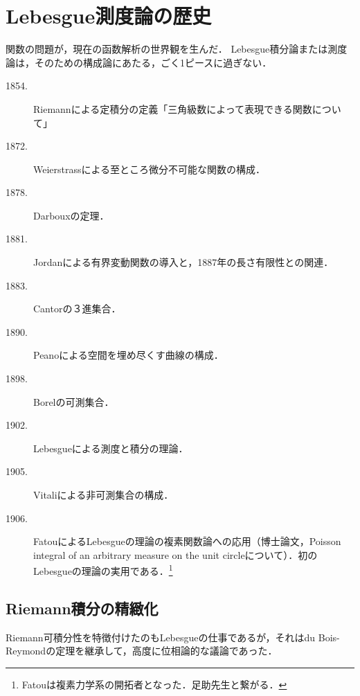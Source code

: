 \documentclass[uplatex, dvipdfmx]{jsreport}
\begin{document}
\section{Lebesgue測度論の歴史}

\begin{tcolorbox}[colframe=ForestGreen, colback=ForestGreen!10!white,breakable,colbacktitle=ForestGreen!40!white,coltitle=black,fonttitle=\bfseries\sffamily,
title=]
    関数の問題が，現在の函数解析の世界観を生んだ．
    Lebesgue積分論または測度論は，そのための構成論にあたる，ごく1ピースに過ぎない．
\end{tcolorbox}

\begin{history}[年表]\mbox{}
    \begin{description}
        \item[1854.] Riemannによる定積分の定義「三角級数によって表現できる関数について」
        \item[1872.] Weierstrassによる至ところ微分不可能な関数の構成．
        \item[1878.] Darbouxの定理．
        \item[1881.] Jordanによる有界変動関数の導入と，1887年の長さ有限性との関連．
        \item[1883.] Cantorの３進集合．
        \item[1890.] Peanoによる空間を埋め尽くす曲線の構成．
        \item[1898.] Borelの可測集合．
        \item[1902.] Lebesgueによる測度と積分の理論．
        \item[1905.] Vitaliによる非可測集合の構成．
        \item[1906.] FatouによるLebesgueの理論の複素関数論への応用（博士論文，Poisson integral of an arbitrary measure on the unit circleについて）．初のLebesgueの理論の実用である．\footnote{Fatouは複素力学系の開拓者となった．足助先生と繋がる．}
    \end{description}
\end{history}

\subsection{Riemann積分の精緻化}

\begin{tcolorbox}[colframe=ForestGreen, colback=ForestGreen!10!white,breakable,colbacktitle=ForestGreen!40!white,coltitle=black,fonttitle=\bfseries\sffamily,
title=]
    Riemann可積分性を特徴付けたのもLebesgueの仕事であるが，それはdu Bois-Reymondの定理を継承して，高度に位相論的な議論であった．

\end{tcolorbox}
\end{document}

